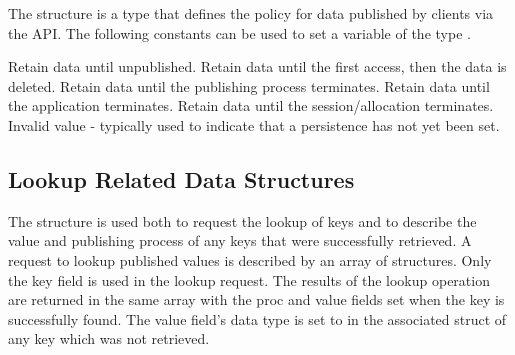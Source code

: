 The  structure is a  type that defines the policy for data published by clients via the  \ac{API}.
The following constants can be used to set a variable of the type .

\begin{constantdesc}
%
Retain data until unpublished.
%
Retain data until the first access, then the data is deleted.
%
Retain data until the publishing process terminates.
%
Retain data until the application terminates.
%
Retain data until the session/allocation terminates.
%
Invalid value - typically used to indicate that a persistence has not yet been set.
%
\end{constantdesc}


\subsection{Lookup Related Data Structures}


The  structure is used both to request the lookup of keys and to describe the value and publishing process of any keys that were successfully retrieved.
A request to lookup published values is described by an array of  structures.
Only the key field is used in the lookup request.
The results of the lookup operation are returned in the same array with the proc and value fields set when the key is successfully found.
The value field's data type is set to  in the associated  struct of any key which was not retrieved.
%

